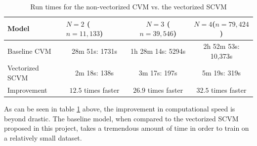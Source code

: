 \begin{table}[H]
\centering
\begin{tabular}{|l|ccc|}
\hline
Model           & \multicolumn{1}{l}{$N = 2$ ($n = 11,133$)} & $N = 3$ ($n = 39,546$)& $N = 4$($n = 79,424$)         \\ \hline
Baseline CVM    & 28m 51s: 1731s            & 1h 28m 14s: 5294s             & 2h 52m 53s: 10,373s    \\
Vectorized SCVM & 2m 18s: 138s              & 3m 17s: 197s  & 5m 19s: 319s    \\ \hline
Improvement & $12.5$ times faster  & $26.9$ times faster  & $32.5$ times faster   \\ \hline
\end{tabular}
\caption{Run times for the non-vectorized CVM vs. the vectorized SCVM}
\label{tab:RuntimeBaseline}
\end{table}
\noindent As can be seen in table \ref{tab:RuntimeBaseline} above, the improvement in computational speed is beyond drastic.
The baseline model, when compared to the vectorized SCVM proposed in this project, takes a tremendous amount of time in order to train on a relatively small dataset.



